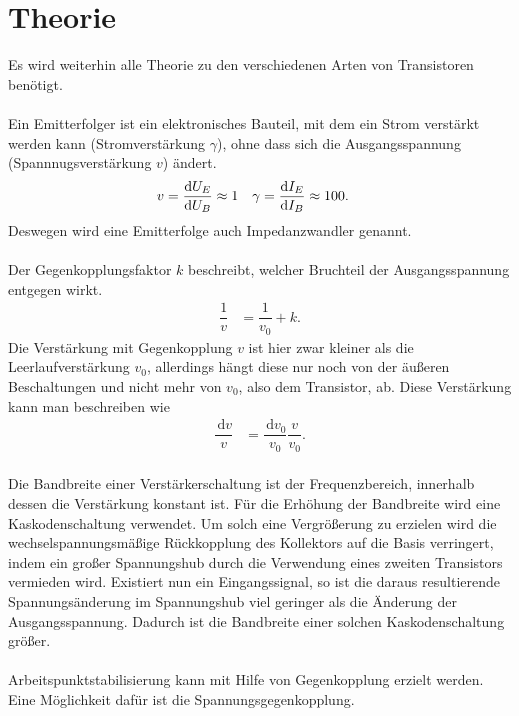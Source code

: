 \documentclass[a4paper,12pt]{article}
\newcommand{\td}{\,\text{d}}
\numberwithin{equation}{section}
\begin{document}
\section{Theorie}
Es wird weiterhin alle Theorie zu den verschiedenen Arten von Transistoren benötigt.
\\\\ Ein Emitterfolger ist ein elektronisches Bauteil, mit dem ein Strom verstärkt werden kann (Stromverstärkung $\gamma $), ohne dass sich die Ausgangsspannung (Spannnugsverstärkung $v$) ändert.
\begin{align} 
        v &= \diff[]{U_E}{U_B}\approx 1 & \gamma &= \diff[]{I_E}{I_B}\approx 100
.\end{align} 
Deswegen wird eine Emitterfolge auch Impedanzwandler genannt.
\\\\ Der Gegenkopplungsfaktor $k$ beschreibt, welcher Bruchteil der Ausgangsspannung entgegen wirkt.
\begin{align} 
        \dfrac{1}{v} &= \dfrac{1}{v_0}+k
.\end{align} 
Die Verstärkung mit Gegenkopplung $v$ ist hier zwar kleiner als die Leerlaufverstärkung $v_0$, allerdings hängt diese nur noch von der äußeren Beschaltungen und nicht mehr von $v_0$, also dem Transistor, ab.
Diese Verstärkung kann man beschreiben wie
\begin{align} 
        \dfrac{\td v}{v} &= \dfrac{\td v_0}{v_0}\dfrac{v}{v_0}
.\end{align} 
\\Die Bandbreite einer Verstärkerschaltung ist der Frequenzbereich, innerhalb dessen die Verstärkung konstant ist.
Für die Erhöhung der Bandbreite wird eine Kaskodenschaltung verwendet.
Um solch eine Vergrößerung zu erzielen wird die wechselspannungsmäßige Rückkopplung des Kollektors auf die Basis verringert, indem ein großer Spannungshub durch die Verwendung eines zweiten Transistors vermieden wird.
Existiert nun ein Eingangssignal, so ist die daraus resultierende Spannungsänderung im Spannungshub viel geringer als die Änderung der Ausgangsspannung.
Dadurch ist die Bandbreite einer solchen Kaskodenschaltung größer.
\\\\Arbeitspunktstabilisierung kann mit Hilfe von Gegenkopplung erzielt werden.
Eine Möglichkeit dafür ist die Spannungsgegenkopplung.
\end{document}
